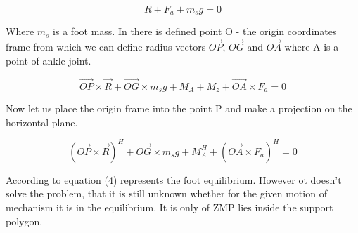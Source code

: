 \documentclass[11pt,a4paper]{article}
\begin{document}
	\begin{equation}
		R + F_a + m_sg = 0
	\end{equation}

Where $m_s$ is a foot mass. In \cite{vukobratovic2004zero} there is defined  point O - the origin coordinates frame from which we can define radius vectors $\vec{OP}$, $\vec{OG}$ and $\vec{OA}$ where A is a point of ankle joint.

	\begin{equation}
		\vec{OP} \times \vec{R} + \vec{OG} \times m_sg + M_A + M_z + \vec{OA} \times F_a = 0
	\end{equation}

Now let us place the origin frame into the point P and make a projection on the horizontal plane. 

	\begin{equation}
		(\vec{OP} \times \vec{R})^H + \vec{OG} \times m_sg + M_A^H + (\vec{OA} \times F_a)^H = 0
	\end{equation}

According to \cite{vukobratovic2004zero} equation (4) represents the foot equilibrium. However ot doesn't solve the problem, that it is still unknown whether for the given motion of mechanism it is in the equilibrium. It is only of ZMP lies inside the support polygon.
\end{document}
